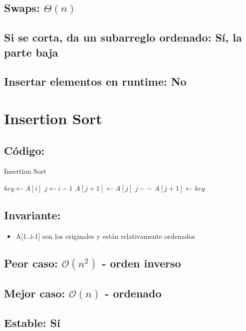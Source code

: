 \documentclass[a4paper]{article}
\begin{document}
\subsection{Swaps: $\Theta (n)$}
\subsection{Si se corta, da un subarreglo ordenado: S\'i, la parte baja}
\subsection{Insertar elementos en runtime: No}
	
\newpage
\section{Insertion Sort}

\subsection{C\'odigo:}
\begin{algorithm}
\caption{Insertion Sort}\label{selection}
\begin{algorithmic}[1]
   	\State $key \gets A[i]$
	\State $j \gets i-1$
    	\State $A[j+1] \gets A[j]$
	\State $j --$
    \EndWhile
    \State $A[j+1] \gets key$
    \EndFor
\EndProcedure
\end{algorithmic}
\end{algorithm}

\subsection{Invariante:}
\begin{itemize}
	\item{A[1..i-1] son los originales y est\'an relativamente ordenados}
\end{itemize}

\subsection{Peor caso: $\mathcal{O}(n^{2})$ - orden inverso}
\subsection{Mejor caso: $\mathcal{O}(n)$ - ordenado}
\subsection{Estable: S\'i}
\end{document}
